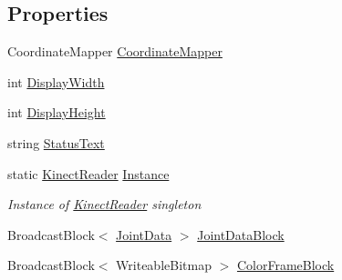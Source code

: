 \subsection*{Properties}
\begin{DoxyCompactItemize}
\item 
Coordinate\+Mapper \hyperlink{class_rowing_monitor_1_1_model_1_1_pipeline_1_1_kinect_reader_abb848deb4ea9ed2ed53f6d95ce1945db}{Coordinate\+Mapper}
\item 
int \hyperlink{class_rowing_monitor_1_1_model_1_1_pipeline_1_1_kinect_reader_a87c7a51b3ac3983882144e85cb90a223}{Display\+Width}
\item 
int \hyperlink{class_rowing_monitor_1_1_model_1_1_pipeline_1_1_kinect_reader_abf9ef0cd7ebc6bfbb3d3035705bacf58}{Display\+Height}
\item 
string \hyperlink{class_rowing_monitor_1_1_model_1_1_pipeline_1_1_kinect_reader_a75073cd905041d0675f11e6ac23836bf}{Status\+Text}
\item 
static \hyperlink{class_rowing_monitor_1_1_model_1_1_pipeline_1_1_kinect_reader}{Kinect\+Reader} \hyperlink{class_rowing_monitor_1_1_model_1_1_pipeline_1_1_kinect_reader_ae0ef04719102355582b9c41b5affed8c}{Instance}
\begin{DoxyCompactList}\small\item\em Instance of \hyperlink{class_rowing_monitor_1_1_model_1_1_pipeline_1_1_kinect_reader}{Kinect\+Reader} singleton \end{DoxyCompactList}\item 
Broadcast\+Block$<$ \hyperlink{struct_rowing_monitor_1_1_model_1_1_util_1_1_joint_data}{Joint\+Data} $>$ \hyperlink{class_rowing_monitor_1_1_model_1_1_pipeline_1_1_kinect_reader_a6e860c115b12d8f17b8f800f9bc64645}{Joint\+Data\+Block}
\item 
Broadcast\+Block$<$ Writeable\+Bitmap $>$ \hyperlink{class_rowing_monitor_1_1_model_1_1_pipeline_1_1_kinect_reader_acfc75a10c6a18c1a8f511944cb411937}{Color\+Frame\+Block}
\end{DoxyCompactItemize}
